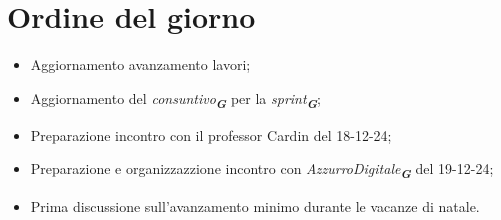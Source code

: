 

\section{Ordine del giorno}

\begin{itemize}
    \item Aggiornamento avanzamento lavori;
    \item Aggiornamento del \emph{consuntivo}\textsubscript{\textit{\textbf{G}}} per la \emph{sprint}\textsubscript{\textit{\textbf{G}}};
    \item Preparazione incontro con il professor Cardin del 18-12-24;
    \item Preparazione e organizzazzione incontro con \emph{AzzurroDigitale}\textsubscript{\textit{\textbf{G}}} del 19-12-24;
    \item Prima discussione sull'avanzamento minimo durante le vacanze di natale.
\end{itemize}
